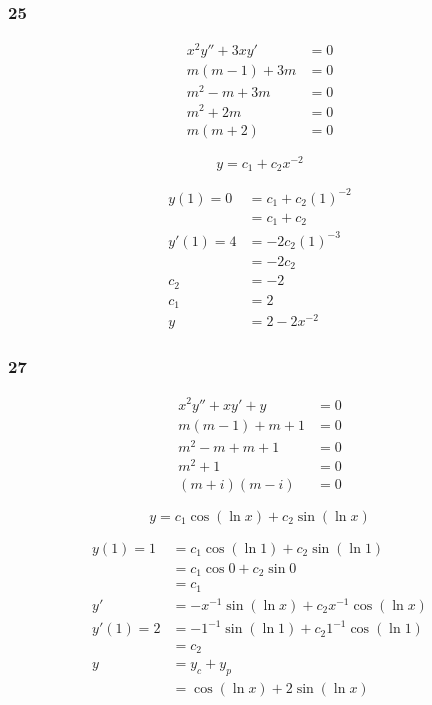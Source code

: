 \documentclass{article}
\begin{document}
\subsubsection{25}

\begin{align*}
  x^2 y'' + 3 x y' & = 0 \\
  m (m - 1) + 3m   & = 0 \\
  m^2 - m + 3m     & = 0 \\
  m^2 + 2m         & = 0 \\
  m (m + 2)        & = 0
\end{align*}

\[y = c_1 + c_2 x^{-2}\]

\begin{align*}
  y(1) = 0  & = c_1 + c_2 (1)^{-2} \\
            & = c_1 + c_2          \\
  y'(1) = 4 & = -2 c_2 (1)^{-3}    \\
            & = -2 c_2             \\
  c_2       & = -2                 \\
  c_1       & = 2                  \\
  y         & = 2 - 2x^{-2}
\end{align*}

\subsubsection{27}

\begin{align*}
  x^2 y'' + x y' + y & = 0 \\
  m (m - 1) + m + 1  & = 0 \\
  m^2 - m + m + 1    & = 0 \\
  m^2 + 1            & = 0 \\
  (m + i) (m - i)    & = 0
\end{align*}

\[y = c_1 \cos (\ln x) + c_2 \sin (\ln x)\]

\begin{align*}
  y(1) = 1  & = c_1 \cos (\ln 1) + c_2 \sin (\ln 1)            \\
            & = c_1 \cos 0 + c_2 \sin 0                        \\
            & = c_1                                            \\
  y'        & = -x^{-1} \sin (\ln x) + c_2 x^{-1} \cos (\ln x) \\
  y'(1) = 2 & = -1^{-1} \sin (\ln 1) + c_2 1^{-1} \cos (\ln 1) \\
            & = c_2                                            \\
  y         & = y_c + y_p                                      \\
            & = \cos (\ln x) + 2 \sin (\ln x)
\end{align*}
\end{document}

